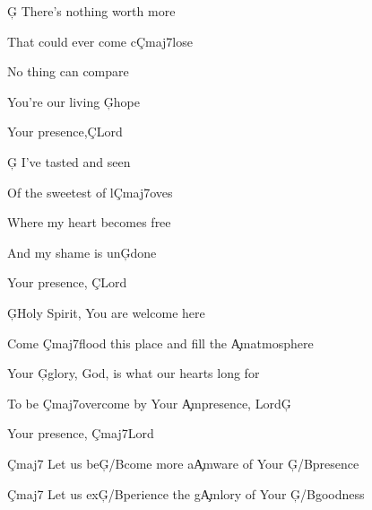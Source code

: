 \documentclass[9pt]{extarticle}
\begin{document}
\bsong

\bv
\c{G} There's nothing worth more

That could ever come c\c{Cmaj7}lose

No thing can compare

You're our living \c{G}hope

Your presence,\c{C}Lord
\ev

\bv
\c{G} I've tasted and seen

Of the sweetest of l\c{Cmaj7}oves

Where my heart becomes free

And my shame is un\c{G}done

Your presence, \c{C}Lord
\ev

\bc
\c{G}Holy Spirit, You are welcome here

Come \c{Cmaj7}flood this place and fill the \c{Am}atmosphere

Your \c{G}glory, God, is what our hearts long for

To be \c{Cmaj7}overcome by Your \c{Am}presence, Lord\c{G}

Your presence, \c{Cmaj7}Lord
\ec




\bb[4]
\c{Cmaj7} Let us be\c{G/B}come more a\c{Am}ware of Your \c{G/B}presence

\c{Cmaj7} Let us ex\c{G/B}perience the g\c{Am}lory of Your \c{G/B}goodness
\eb


\esong
\end{document}
